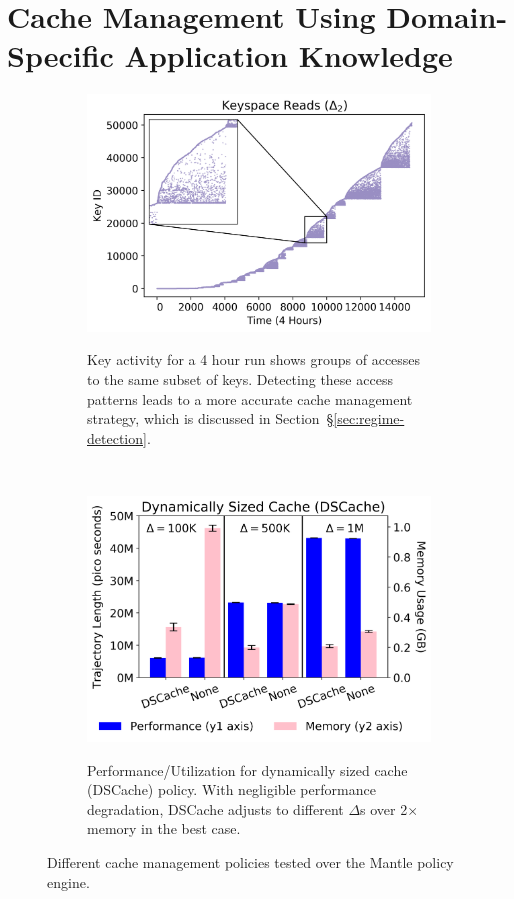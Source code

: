 \section{Cache Management Using Domain-Specific Application Knowledge}
\label{sec:dom-specific}

\begin{figure}[t!]
    \begin{subfigure}[t]{0.48\textwidth}
        \centering
	\includegraphics[width=1\textwidth]{figures/keyspace-zoomed.png}\\
\caption{Key activity for a 4 hour run shows groups of accesses to the same
subset of keys. Detecting these access patterns leads to a more accurate cache
management strategy, which is discussed in
Section~\S\ref{sec:regime-detection}.\label{fig:keyspace-zoomed}}
    \end{subfigure}%
    ~ 
    \begin{subfigure}[t]{0.5\textwidth}
        \centering
        \includegraphics[width=1\textwidth]{figures/dscache-vs-none.png}\\
	\caption{Performance/Utilization for dynamically sized cache (DSCache)
policy. With negligible performance degradation, DSCache adjusts to different
\(\Delta\)s over 2\(\times\) memory in the best case.
\label{fig:dscache-vs-none}}
    \end{subfigure}%
    \caption{Different cache management policies tested over the Mantle policy engine.}
\end{figure}

